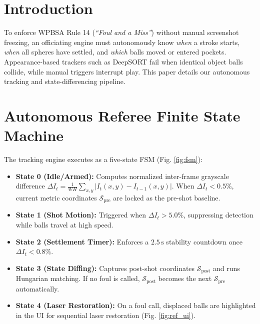 \documentclass[conference]{IEEEtran}
\begin{document}
\section{Introduction}
To enforce WPBSA Rule 14 (\textit{``Foul and a Miss''}) without manual screenshot freezing, an officiating engine must autonomously know \textit{when} a stroke starts, \textit{when} all spheres have settled, and \textit{which} balls moved or entered pockets. Appearance-based trackers such as DeepSORT \cite{ref21} fail when identical object balls collide, while manual triggers interrupt play. This paper details our autonomous tracking and state-differencing pipeline.

\section{Autonomous Referee Finite State Machine}
The tracking engine executes as a five-state FSM (Fig. \ref{fig:fsm}):
\begin{itemize}
    \item \textbf{State 0 (Idle/Armed):} Computes normalized inter-frame grayscale difference $\Delta I_t = \frac{1}{WH}\sum_{x,y}|I_t(x,y)-I_{t-1}(x,y)|$. When $\Delta I_t < 0.5\%$, current metric coordinates $\mathcal{S}_{\text{pre}}$ are locked as the pre-shot baseline.
    \item \textbf{State 1 (Shot Motion):} Triggered when $\Delta I_t > 5.0\%$, suppressing detection while balls travel at high speed.
    \item \textbf{State 2 (Settlement Timer):} Enforces a $2.5\,\text{s}$ stability countdown once $\Delta I_t < 0.8\%$.
    \item \textbf{State 3 (State Diffing):} Captures post-shot coordinates $\mathcal{S}_{\text{post}}$ and runs Hungarian matching. If no foul is called, $\mathcal{S}_{\text{post}}$ becomes the next $\mathcal{S}_{\text{pre}}$ automatically.
    \item \textbf{State 4 (Laser Restoration):} On a foul call, displaced balls are highlighted in the UI for sequential laser restoration (Fig. \ref{fig:ref_ui}).
\end{itemize}
\end{document}
